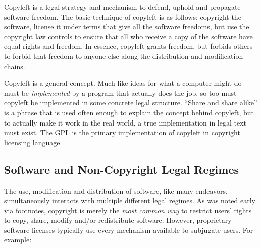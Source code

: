 \label{copyleft-definition}

Copyleft is a legal strategy and mechanism to defend, uphold and propagate software
freedom. The basic technique of copyleft is as follows: copyright the
software, license it under terms that give all the software freedoms, but
use the copyright law controls to ensure that all who receive a copy of
the software have equal rights and freedom. In essence, copyleft grants
freedom, but forbids others to forbid that freedom to anyone else along
the distribution and modification chains.

Copyleft is a general concept. Much like ideas for what a computer might
do must be \emph{implemented} by a program that actually does the job, so
too must copyleft be implemented in some concrete legal structure.
``Share and share alike'' is a phrase that is used often enough to explain the
concept behind copyleft, but to actually make it work in the real world, a
true implementation in legal text must exist. The GPL is the primary
implementation of copyleft in copyright licensing language.

\subsection{Software and Non-Copyright Legal Regimes}
\label{software-and-non-copyright}

The use, modification and distribution of software, like many endeavors,
simultaneously interacts with multiple different legal regimes.  As was noted
early via footnotes, copyright is merely the \textit{most common way} to
restrict users' rights to copy, share, modify and/or redistribute software.
However, proprietary software licenses typically use every mechanism
available to subjugate users.  For example:

